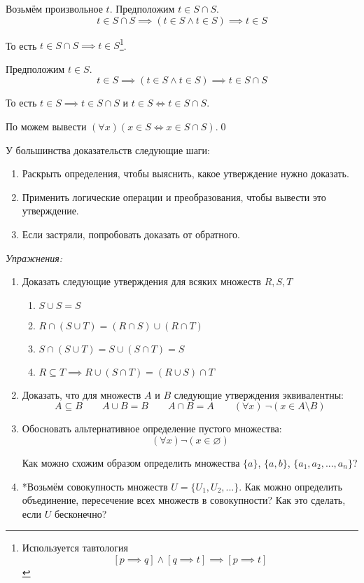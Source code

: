 Возьмём произвольное $t$. Предположим $t\in S\cap S$.
\[
	t\in S\cap S\implies (t\in S\land t\in S)\implies t\in S
\]

То есть $t\in S\cap S\implies t\in S$\footnote{Используется
	тавтология
	\[
		[p\implies q]\land[q\implies t]\implies [p\implies t]
	\]
}.

Предположим $t\in S$.
\[
	t\in S\implies (t\in S\land t\in S)\implies t\in S\cap S
\]

То есть $t\in S\implies t\in S\cap S$ и $t\in S\iff t\in S\cap S$.

По \Aii{} можем вывести $(\forall x)(x\in S\iff x\in S\cap S)$.\qed

\pagebreak

У большинства доказательств следующие шаги:
\begin{enumerate}
	\item{}Раскрыть определения, чтобы выяснить, какое утверждение нужно доказать.
	\item{}Применить логические операции и преобразования, чтобы вывести это утверждение.
	\item{}Если застряли, попробовать доказать от обратного.
\end{enumerate}

{\it Упражнения:}
\begin{enumerate}
	\item{}Доказать следующие утверждения для всяких множеств $R,S,T$
	\begin{enumerate}
		\item{}$S\cup S=S$
		\item{}$R\cap (S\cup T)=(R\cap S)\cup (R\cap T)$
		\item{}$S\cap (S\cup T)=S\cup (S\cap T)=S$
		\item{}$R\subseteq T\implies R\cup (S\cap T)=(R\cup S)\cap T$
	\end{enumerate}

	\item{}Доказать, что для множеств $A$ и $B$ следующие утверждения эквивалентны:
	\[
		A\subseteq B\qquad A\cup B=B\qquad A\cap B=A
		\qquad (\forall x)~\lnot(x\in A\setminus B)
	\]
	\item{}Обосновать альтернативное определение пустого множества:
	\[
		(\forall x)\lnot(x\in \varnothing)
	\]

	Как можно схожим образом определить множества $\{a\}$, $\{a,b\}$,
	$\{a_1,a_2,...,a_{n}\}$?
	\item{}*Возьмём совокупность множеств $U=\{U_{1},U_{2},...\}$.
	Как можно определить объединение, пересечение всех множеств в совокупности?
	Как это сделать, если $U$ бесконечно?
\end{enumerate}

